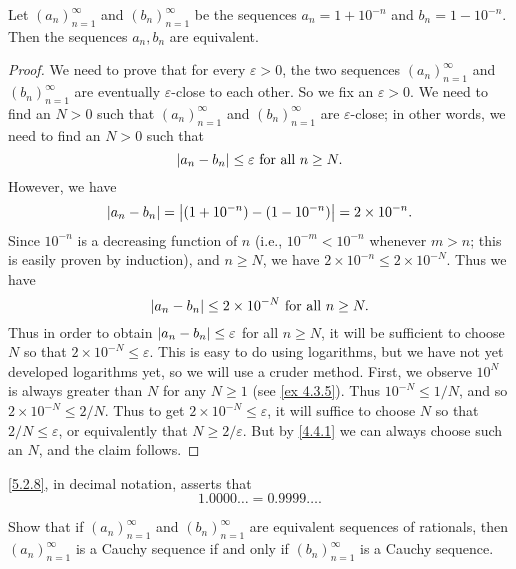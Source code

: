 \begin{proposition}\label{5.2.8}
  Let \((a_n)_{n = 1}^{\infty}\) and \((b_n)_{n = 1}^{\infty}\) be the sequences \(a_n = 1 + 10^{-n}\) and \(b_n = 1 - 10^{-n}\).
  Then the sequences \(a_n, b_n\) are equivalent.
\end{proposition}

\begin{proof}
  We need to prove that for every \(\varepsilon > 0\), the two sequences \((a_n)_{n = 1}^{\infty}\) and \((b_n)_{n = 1}^{\infty}\) are eventually \(\varepsilon\)-close to each other.
  So we fix an \(\varepsilon > 0\).
  We need to find an \(N > 0\) such that \((a_n)_{n = 1}^{\infty}\) and \((b_n)_{n = 1}^{\infty}\) are \(\varepsilon\)-close;
  in other words, we need to find an \(N > 0\) such that
  \[
    \left\lvert a_n - b_n\right\rvert \leq \varepsilon \text{ for all } n \geq N.
  \]
  However, we have
  \[
    \left\lvert a_n - b_n\right\rvert = \left\lvert(1 + 10^{-n}) - (1 - 10^{-n})\right\rvert = 2 \times 10^{-n}.
  \]
  Since \(10^{-n}\) is a decreasing function of \(n\) (i.e., \(10^{-m} < 10^{-n}\) whenever \(m > n\);
  this is easily proven by induction), and \(n \geq N\), we have \(2 \times 10^{-n} \leq 2 \times 10^{-N}\).
  Thus we have
  \[
    \left\lvert a_n - b_n\right\rvert \leq 2 \times 10^{-N} \text{ for all } n \geq N.
  \]
  Thus in order to obtain \(\left\lvert a_n - b_n\right\rvert \leq \varepsilon\) for all \(n \geq N\), it will be sufficient to choose \(N\) so that \(2 \times 10^{-N} \leq \varepsilon\).
  This is easy to do using logarithms, but we have not yet developed logarithms yet, so we will use a cruder method.
  First, we observe \(10^N\) is always greater than \(N\) for any \(N \geq 1\) (see \cref{ex 4.3.5}).
  Thus \(10^{-N} \leq 1 / N\), and so \(2 \times 10^{-N} \leq 2 / N\).
  Thus to get \(2 \times 10^{-N} \leq \varepsilon\), it will suffice to choose \(N\) so that \(2 / N \leq \varepsilon\), or equivalently that \(N \geq 2 / \varepsilon\).
  But by \cref{4.4.1} we can always choose such an \(N\), and the claim follows.
\end{proof}

\begin{remark}\label{5.2.9}
  \cref{5.2.8}, in decimal notation, asserts that
  \[
    1.0000 \dots = 0.9999 \dots.
  \]
\end{remark}

\exercisesection

\begin{exercise}\label{ex 5.2.1}
  Show that if \((a_n)_{n = 1}^{\infty}\) and \((b_n)_{n = 1}^{\infty}\) are equivalent sequences of rationals, then \((a_n)_{n = 1}^{\infty}\) is a Cauchy sequence if and only if \((b_n)_{n = 1}^{\infty}\) is a Cauchy sequence.
\end{exercise}

